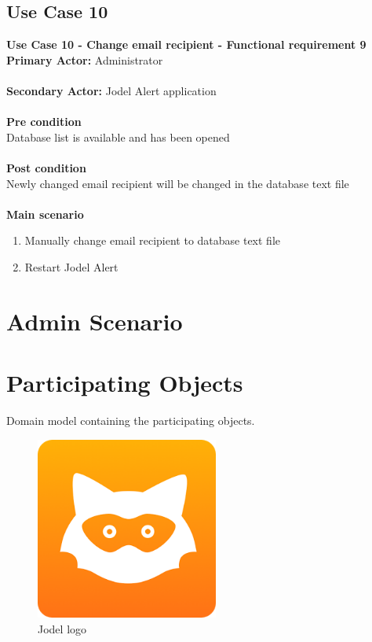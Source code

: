 \documentclass[a4paper,12pt]{article}
\begin{document}
\subsection{Use Case 10}
\textbf{Use Case 10 - Change email recipient - Functional requirement 9}\\
\textbf{Primary Actor:}
Administrator\\\\
\textbf{Secondary Actor:}
Jodel Alert application\\\\
\textbf{Pre condition}\\
Database list is available and has been opened\\\\
\textbf{Post condition}\\
Newly changed email recipient will be changed in the database text file\\\\
\textbf{Main scenario}
\begin{enumerate}
	\item Manually change email recipient to database text file
	\item Restart Jodel Alert
\end{enumerate}
\clearpage
\section{Admin Scenario}
\section{Participating Objects}
Domain model containing the participating objects.\\

\begin{figure}[!h]
	\centering
	\includegraphics[height=6cm]{img/jodel.png}
	\caption{Jodel logo}
	\label{Jodel}
\end{figure}
\end{document}
